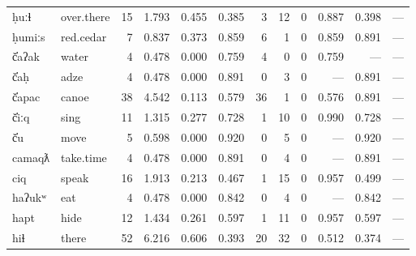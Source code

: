 \begin{landscape}
\begin{longtable}[c]{ l l | r r c c | r r r | r r r }
  ḥuːɬ               & over.there                & 15  & 1.793                     & 0.455           & 0.385      & 3         & 12          & 0            & 0.887     & 0.398       & —\\
  ḥumiːs             & red.cedar                 & 7   & 0.837                     & 0.373           & 0.859      & 6         & 1           & 0            & 0.859     & 0.891       & —\\
  č̓aʔak              & water                     & 4   & 0.478                     & 0.000           & 0.759      & 4         & 0           & 0            & 0.759     & —           & —\\
  č̓aḥ                & adze                      & 4   & 0.478                     & 0.000           & 0.891      & 0         & 3           & 0            & —         & 0.891       & —\\
  č̓apac              & canoe                     & 38  & 4.542                     & 0.113           & 0.579      & 36        & 1           & 0            & 0.576     & 0.891       & —\\
  č̓iːq               & sing                      & 11  & 1.315                     & 0.277           & 0.728      & 1         & 10          & 0            & 0.990     & 0.728       & —\\
  č̓u                 & move                      & 5   & 0.598                     & 0.000           & 0.920      & 0         & 5           & 0            & —         & 0.920       & —\\
  camaqƛ             & take.time                 & 4   & 0.478                     & 0.000           & 0.891      & 0         & 4           & 0            & —         & 0.891       & —\\
  ciq                & speak                     & 16  & 1.913                     & 0.213           & 0.467      & 1         & 15          & 0            & 0.957     & 0.499       & —\\
  haʔukʷ             & eat                       & 4   & 0.478                     & 0.000           & 0.842      & 0         & 4           & 0            & —         & 0.842       & —\\
  hapt               & hide                      & 12  & 1.434                     & 0.261           & 0.597      & 1         & 11          & 0            & 0.957     & 0.597       & —\\
  hiɬ                & there                     & 52  & 6.216                     & 0.606           & 0.393      & 20        & 32          & 0            & 0.512     & 0.374       & —\\

\end{longtable}
\end{landscape}
